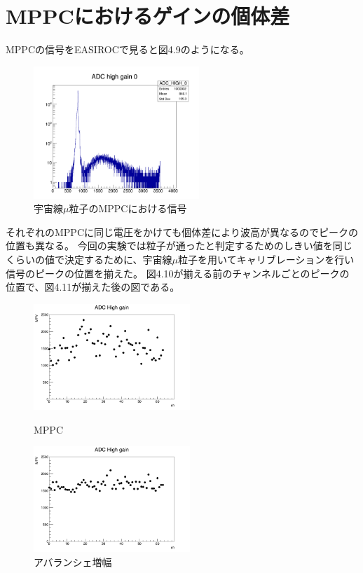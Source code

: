 \section{MPPCにおけるゲインの個体差}
MPPCの信号をEASIROCで見ると図4.9のようになる。
\begin{figure}[H]
    \centering
    \includegraphics[height=5cm]{img/mppc_gain.jpg}
    \caption{宇宙線$\mu$粒子のMPPCにおける信号}
\end{figure}
それぞれのMPPCに同じ電圧をかけても個体差により波高が異なるのでピークの位置も異なる。
今回の実験では粒子が通ったと判定するためのしきい値を同じくらいの値で決定するために、宇宙線$\mu$粒子を用いてキャリブレーションを行い信号のピークの位置を揃えた。
図4.10が揃える前のチャンネルごとのピークの位置で、図4.11が揃えた後の図である。
\begin{figure}[H]
    \begin{minipage}[b]{0.45\linewidth}
        \centering
        \includegraphics[height=4cm]{img/gain_before.jpg}
        \caption{MPPC}
    \end{minipage}
    \begin{minipage}[b]{0.45\linewidth}
        \centering
        \includegraphics[height=4cm]{img/gain_after.jpg}
        \caption{アバランシェ増幅}
    \end{minipage}
\end{figure}